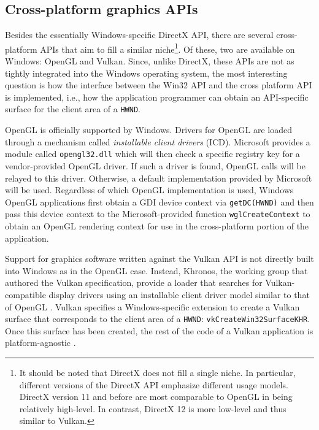 \documentclass[10pt,twocolumn,a4paper]{article}
\begin{document}
		\subsection{Cross-platform graphics APIs}
			Besides the essentially Windows-specific DirectX API, there are several
			cross-platform APIs that aim to fill a similar niche\footnote{It
			should be noted that DirectX does not fill a single niche. In particular,
			different versions of the DirectX API emphasize different usage models.
			DirectX version 11 and before are most comparable to OpenGL in being
			relatively high-level. In contrast, DirectX 12 is more low-level and
			thus similar to Vulkan.}. Of these, two are available on Windows: OpenGL
			and Vulkan. Since, unlike DirectX, these APIs are not as tightly integrated
			into the Windows operating system, the most interesting question is
			how the interface between the Win32 API and the cross platform API
			is implemented, i.e., how the application programmer can obtain an
			API-specific surface for the client area of a \texttt{HWND}.

			OpenGL is officially supported by Windows. Drivers for OpenGL are
			loaded through a mechanism called \textit{installable client
			drivers} (ICD). Microsoft provides a module called
			\texttt{opengl32.dll} which will then check a specific registry key
			for a vendor-provided OpenGL driver. If such a driver is found,
			OpenGL calls will be relayed to this driver. Otherwise, a
			default implementation provided by Microsoft will be used. Regardless
			of which OpenGL implementation is used, Windows OpenGL applications first obtain
			a GDI device context via \texttt{getDC(HWND)} and then pass this device
			context to the Microsoft-provided function \texttt{wglCreateContext}
			to obtain an OpenGL rendering context for use in the cross-platform portion
			of the application. \cite{oglrc,oglicd}

			Support for graphics software written against the Vulkan API is not
			directly built into Windows as in the OpenGL case. Instead,
			Khronos, the working group that authored the Vulkan specification,
			provide a loader that searches for Vulkan-compatible display
			drivers using an installable client driver model similar to that of
			OpenGL \cite{vulkanloader}. Vulkan specifies a Windows-specific
			extension to create a Vulkan surface that corresponds to the client
			area of a \texttt{HWND}: \texttt{vkCreateWin32SurfaceKHR}. Once
			this surface has been created, the rest of the code of a Vulkan
			application is platform-agnostic \cite{vulkanspec}.
\end{document}
